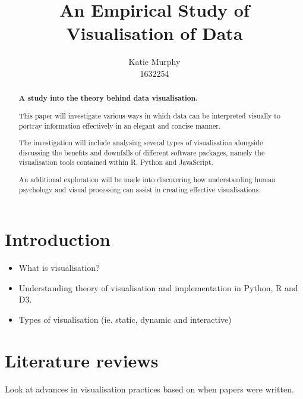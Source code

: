 \documentclass[12pt]{article}
\title{\textbf{An Empirical Study of Visualisation of Data}}
\author{Katie Murphy \\ 1632254}
\begin{document}
\maketitle

\newpage

\begin{abstract}

\begin{center}
    \noindent \textbf{A study into the theory behind data visualisation.} 
    
     \vspace{0.3cm}
    
    \noindent This paper will investigate various ways in which data can be interpreted visually to portray information effectively in an elegant and concise manner. 
    
    \vspace{0.3cm}
    
    \noindent The investigation will include analysing several types of visualisation alongside discussing the benefits and downfalls of different software packages, namely the visualisation tools contained within R, Python and JavaScript.
    
    \vspace{0.3cm}
    
    An additional exploration will be made into discovering how understanding human psychology and visual processing can assist in creating effective visualisations.
    

\end{center}    
 
\end{abstract}



\newpage


\section{Introduction}

\begin{itemize}
\item What is visualisation?
\item Understanding theory of visualisation and implementation in Python, R and D3.
\item Types of visualisation (ie. static, dynamic and interactive)
\end{itemize}

\section{Literature reviews}
Look at advances in visualisation practices based on when papers were written.
\end{document}
